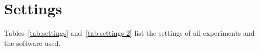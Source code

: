 \section{Settings}\label{sup:settings}

Tables~\ref{tab:settings} and~\ref{tab:settings-2} list the settings of
all experiments and the software used.

\begin{table}[!ht]
\caption{Settings of the model, of the federation and of a FedAvg SFT
round}\label{tab:settings}
\footnotesize

\end{table}

\begin{table}[!ht]
\caption{Settings of a preference round and of evaluation, with the
software and hardware of the experiments. Software is listed with its
version and maker}\label{tab:settings-2}
\footnotesize

\end{table}
